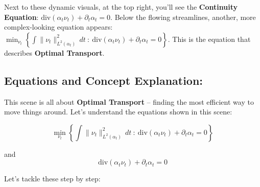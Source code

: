 \documentclass{article}
\begin{document}
Next to these dynamic visuals, at the top right, you'll see the \textbf{Continuity Equation}: \( \text{div}(\alpha_t \nu_t) + \partial_t \alpha_t = 0 \). Below the flowing streamlines, another, more complex-looking equation appears: \( \min_{\nu_t} \left\{ \int \|\nu_t\|_{L^2(\alpha_t)}^2 \, dt \ : \ \text{div}(\alpha_t \nu_t) + \partial_t \alpha_t = 0 \right\} \).  This is the equation that describes \textbf{Optimal Transport}.

\subsection*{Equations and Concept Explanation: }

This scene is all about \textbf{Optimal Transport} – finding the most efficient way to move things around. Let's understand the equations shown in this scene:

\[
\min_{\nu_t} \left\{ \int \|\nu_t\|_{L^2(\alpha_t)}^2 \, dt \ : \ \text{div}(\alpha_t \nu_t) + \partial_t \alpha_t = 0 \right\}
\]

and
\[
\text{div}(\alpha_t \nu_t) + \partial_t \alpha_t = 0
\]

Let's tackle these step by step:
\end{document}
